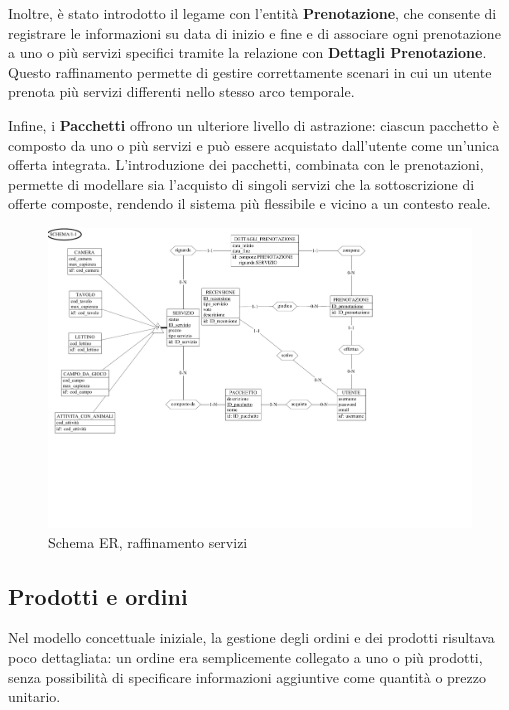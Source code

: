 \documentclass[a4paper,12pt]{report}
\begin{document}
\vspace{\baselineskip}
Inoltre, è stato introdotto il legame con l'entità \textbf{Prenotazione}, che consente di registrare le informazioni su data di inizio
e fine e di associare ogni prenotazione a uno o più servizi specifici tramite la relazione con \textbf{Dettagli Prenotazione}. Questo
raffinamento permette di gestire correttamente scenari in cui un utente prenota più servizi differenti nello stesso arco
temporale.

\vspace{\baselineskip}
Infine, i \textbf{Pacchetti} offrono un ulteriore livello di astrazione: ciascun pacchetto è composto da uno o più servizi e può essere
acquistato dall'utente come un'unica offerta integrata. L'introduzione dei pacchetti, combinata con le prenotazioni, permette
di modellare sia l'acquisto di singoli servizi che la sottoscrizione di offerte composte, rendendo il sistema più flessibile e
vicino a un contesto reale.

\begin{figure}[H]
	\centering
	\includegraphics[width=\textwidth, trim=0 175pt 175pt 0, clip]{./pdf/raffinamento servizi.pdf}
	\caption{Schema ER, raffinamento servizi}
	\label{fig:raffinamento-servizi}
\end{figure}

\newpage
\subsection{Prodotti e ordini}
Nel modello concettuale iniziale, la gestione degli ordini e dei prodotti risultava poco dettagliata: un ordine era
semplicemente collegato a uno o più prodotti, senza possibilità di specificare informazioni aggiuntive come quantità o
prezzo unitario.
\end{document}
